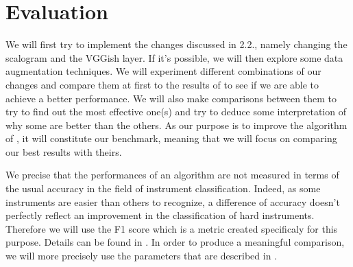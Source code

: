 \documentclass[final]{cvpr}
\begin{document}
\section{Evaluation}
We will first try to implement the changes discussed in 2.2., namely changing the scalogram and the VGGish layer. If it's possible, we will then explore some data augmentation techniques. We will experiment different combinations of our changes and compare them at first to the results of \cite{squelette_progr} to see if we are able to achieve a better performance. We will also make comparisons between them to try to find out the most effective one(s) and try to deduce some interpretation of why some are better than the others. As our purpose is to improve the algorithm of \cite{squelette_progr}, it will constitute our benchmark, meaning that we will focus on comparing our best results with theirs. 

We precise that the performances of an algorithm are not measured in terms of the usual accuracy in the field of instrument classification. Indeed, as some instruments are easier than others to recognize, a difference of accuracy doesn't perfectly reflect an improvement in the classification of hard instruments. Therefore we will use the F1 score which is a metric created specificaly for this purpose. Details can be found in \cite{metric}. In order to produce a meaningful comparison, we will more precisely use the parameters that are described in \cite{squelette_progr}.
{\small
	
	
}
\end{document}
